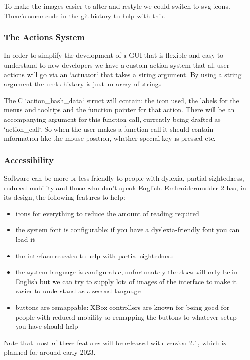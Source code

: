 \documentclass[a4paper, 11pt]{report}
\begin{document}
To make the images easier to alter and restyle we could
switch to svg icons. There's some code in the git history
to help with this.

\subsubsection{The Actions System}

In order to simplify the development of a GUI that is flexible and
easy to understand to new developers we have a custom action system that all
user actions will go via an `actuator` that takes a string argument. By using a
string argument the undo history is just an array of strings.

The C `action\_hash\_data` struct will contain: the icon used, the labels for the
menus and tooltips and the function pointer for that action.
There will be an accompanying argument for this function call, currently being
drafted as `action\_call`. So when the user makes a function call it should
contain information like the mouse position, whether special key is pressed
etc.

\subsubsection{Accessibility}

Software can be more or less friendly to people with dylexia, partial sightedness,
reduced mobility and those who don't speak English.
Embroidermodder 2 has, in its design, the following features to help:

\begin{itemize}
\item icons for everything to reduce the amount of reading required
\item the system font is configurable: if you have a dyslexia-friendly font you can load it
\item the interface rescales to help with partial-sightedness
\item the system language is configurable, unfortunately the docs will only be in English but we can try to supply lots of images of the interface to make it easier to understand as a second language
\item buttons are remappable: XBox controllers are known for being good for people with reduced mobility so remapping the buttons to whatever setup you have should help
\end{itemize}

Note that most of these features will be released with version 2.1, which is planned for around early 2023.
\end{document}
